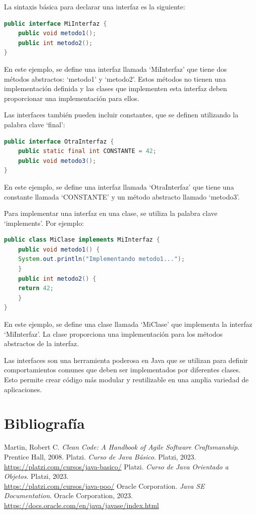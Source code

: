 \documentclass[executivepaper]{article}
\begin{document}
La sintaxis básica para declarar una interfaz es la siguiente:

\begin{lstlisting}[language=Java]
public interface MiInterfaz {
    public void metodo1();
    public int metodo2();
}
\end{lstlisting}
En este ejemplo, se define una interfaz llamada \enquote*{MiInterfaz} que tiene dos métodos abstractos: \enquote*{metodo1} y \enquote*{metodo2}. Estos métodos no tienen una implementación definida y las clases que implementen esta interfaz deben proporcionar una implementación para ellos.

Las interfaces también pueden incluir constantes, que se definen utilizando la palabra clave \enquote*{final}:

\begin{lstlisting}[language=Java]
public interface OtraInterfaz {
    public static final int CONSTANTE = 42;
    public void metodo3();
}
\end{lstlisting}

En este ejemplo, se define una interfaz llamada \enquote*{OtraInterfaz} que tiene una constante llamada \enquote*{CONSTANTE} y un método abstracto llamado \enquote*{metodo3}.

Para implementar una interfaz en una clase, se utiliza la palabra clave \enquote*{implements}. Por ejemplo:

\begin{lstlisting}[language=Java]
public class MiClase implements MiInterfaz {
    public void metodo1() {
    System.out.println("Implementando metodo1...");
    }
    public int metodo2() {
    return 42;
    }
}
\end{lstlisting}

En este ejemplo, se define una clase llamada \enquote*{MiClase} que implementa la interfaz \enquote*{MiInterfaz}. La clase proporciona una implementación para los métodos abstractos de la interfaz.

Las interfaces son una herramienta poderosa en Java que se utilizan para definir comportamientos comunes que deben ser implementados por diferentes clases. Esto permite crear código más modular y reutilizable en una amplia variedad de aplicaciones.

\newpage
\section{Bibliografía}
\begin{thebibliography}{9}
 Martin, Robert C. \textit{Clean Code: A Handbook of Agile Software Craftsmanship}. Prentice Hall, 2008.
 Platzi. \textit{Curso de Java Básico}. Platzi, 2023.\\ \url{https://platzi.com/cursos/java-basico/}
 Platzi. \textit{Curso de Java Orientado a Objetos}. Platzi, 2023.\\ \url{https://platzi.com/cursos/java-poo/}
 Oracle Corporation. \textit{Java SE Documentation}. Oracle Corporation, 2023.\\ \url{https://docs.oracle.com/en/java/javase/index.html}
\end{thebibliography}
\end{document}
